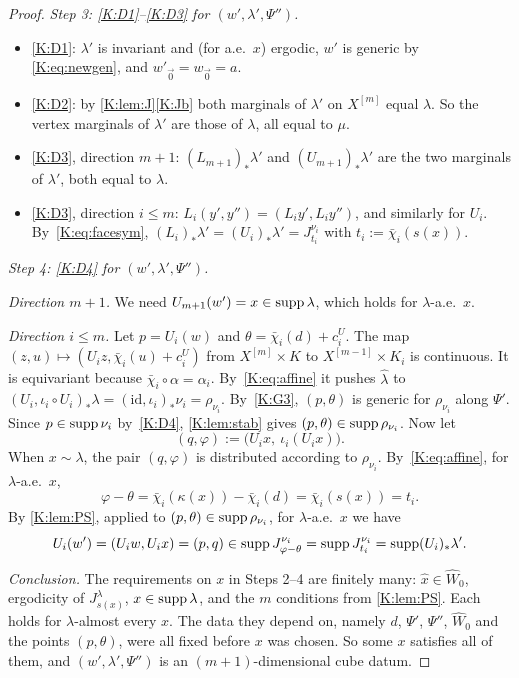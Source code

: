 \begin{proof}
\emph{Step 3: \ref{K:D1}--\ref{K:D3} for $(w',\lambda',\Psi'')$.}
\begin{itemize}
\item \ref{K:D1}: $\lambda'$ is invariant and (for a.e.\ $x$) ergodic, $w'$ is generic by
\eqref{K:eq:newgen}, and $w'_{\vec0}=w_{\vec0}=a$.
\item \ref{K:D2}: by \cref{K:lem:J}\ref{K:Jb} both marginals of $\lambda'$ on $X^{[m]}$ equal
$\lambda$. So the vertex marginals of $\lambda'$ are those of $\lambda$, all equal to $\mu$.
\item \ref{K:D3}, direction $m+1$: $(L_{m+1})_*\lambda'$ and $(U_{m+1})_*\lambda'$ are the two
marginals of $\lambda'$, both equal to $\lambda$.
\item \ref{K:D3}, direction $i\le m$: $L_i(y',y'')=(L_iy',L_iy'')$, and similarly for $U_i$.
By~\eqref{K:eq:facesym}, $(L_i)_*\lambda'=(U_i)_*\lambda'=J^{\nu_i}_{t_i}$ with
$t_i:=\bar\chi_i(s(x))$.
\end{itemize}

\emph{Step 4: \ref{K:D4} for $(w',\lambda',\Psi'')$.}

\emph{Direction $m+1$.} We need $U_{m+1}(w')=x\in\operatorname{supp}\lambda$, which holds for
$\lambda$-a.e.\ $x$.

\emph{Direction $i\le m$.}
Let $p=U_i(w)$ and $\theta=\bar\chi_i(d)+c_i^U$.
The map $(z,u)\mapsto(U_iz,\bar\chi_i(u)+c_i^U)$ from $X^{[m]}\times K$ to $X^{[m-1]}\times K_i$
is continuous. It is equivariant because $\bar\chi_i\circ\alpha=\alpha_i$.
By~\eqref{K:eq:affine} it pushes $\hat\lambda$ to
$(U_i,\iota_i\circ U_i)_*\lambda=(\mathrm{id},\iota_i)_*\nu_i=\rho_{\nu_i}$.
By~\ref{K:G3}, $(p,\theta)$ is generic for $\rho_{\nu_i}$ along $\Psi'$.
Since $p\in\operatorname{supp}\nu_i$ by~\ref{K:D4}, \cref{K:lem:stab} gives $(p,\theta)\in\operatorname{supp}\rho_{\nu_i}$.
Now let
\[
(q,\varphi):=\big(U_ix,\ \iota_i(U_ix)\big).
\]
When $x\sim\lambda$, the pair $(q,\varphi)$ is distributed according to $\rho_{\nu_i}$.
By~\eqref{K:eq:affine}, for $\lambda$-a.e.\ $x$,
\[
\varphi-\theta=\bar\chi_i(\kappa(x))-\bar\chi_i(d)=\bar\chi_i(s(x))=t_i .
\]
By \cref{K:lem:PS}, applied to $(p,\theta)\in\operatorname{supp}\rho_{\nu_i}$, for $\lambda$-a.e.\ $x$ we have
\[
U_i(w')=(U_iw,U_ix)=(p,q)\in\operatorname{supp} J^{\nu_i}_{\varphi-\theta}=\operatorname{supp} J^{\nu_i}_{t_i}=\operatorname{supp}(U_i)_*\lambda' .
\]

\emph{Conclusion.}
The requirements on $x$ in Steps 2--4 are finitely many: $\hat x\in\widehat W_0$, ergodicity of
$J^\lambda_{s(x)}$, $x\in\operatorname{supp}\lambda$, and the $m$ conditions from \cref{K:lem:PS}.
Each holds for $\lambda$-almost every $x$.
The data they depend on, namely $d$, $\Psi'$, $\Psi''$, $\widehat W_0$ and the points
$(p,\theta)$, were all fixed before $x$ was chosen.
So some $x$ satisfies all of them, and $(w',\lambda',\Psi'')$ is an $(m+1)$-dimensional
cube datum.
\end{proof}


